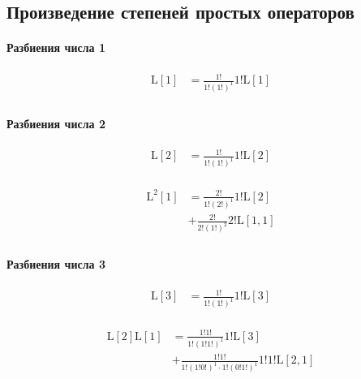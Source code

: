 
\subsection{Произведение степеней простых операторов}

\paragraph{Разбиения числа 1}

\begin{equation*} \begin{aligned}
  \mathrm{L}[1] &=
  \frac{1!}{1!(1!)^1}
  1! \mathrm{L}[1] \\
\end{aligned} \end{equation*}

\paragraph{Разбиения числа 2}

\begin{equation*} \begin{aligned}
  \mathrm{L}[2] &=
  \frac{1!}{1!(1!)^1}
  1! \mathrm{L}[2] \\
\end{aligned} \end{equation*}

\begin{equation*} \begin{aligned}
  \mathrm{L}^2[1] &=
  \frac{2!}{1!(2!)^1}
  1! \mathrm{L}[2] \\ &
+ \frac{2!}{2!(1!)^2}
  2! \mathrm{L}[1, 1] \\
\end{aligned} \end{equation*}

\paragraph{Разбиения числа 3}

\begin{equation*} \begin{aligned}
  \mathrm{L}[3] &=
  \frac{1!}{1!(1!)^1}
  1! \mathrm{L}[3] \\
\end{aligned} \end{equation*}

\begin{equation*} \begin{aligned}
  \mathrm{L}[2] \mathrm{L}[1] &=
  \frac{1!1!}{1!(1!1!)^1}
  1! \mathrm{L}[3] \\ &
+ \frac{1!1!}{1!(1!0!)^1 \cdot 1!(0!1!)^1}
  1!1! \mathrm{L}[2, 1] \\
\end{aligned} \end{equation*}


